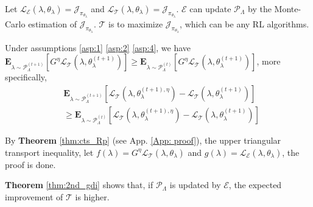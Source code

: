 \begin{Example}
    Let $\mathcal{L}_{\mathcal{E}} (\lambda, \theta_{\lambda}) = \mathcal{J}_{\pi_{\theta_{\lambda}}}$ and $\mathcal{L}_{\mathcal{T}} (\lambda, \theta_{\lambda}) = \mathcal{J}_{\pi_{\theta_{\lambda}}}$.
    $\mathcal{E}$ can update $\mathcal{P}_{\Lambda}$ by the Monte-Carlo estimation of $\mathcal{J}_{\pi_{\theta_{\lambda}}}$.
    $\mathcal{T}$ is to maximize $\mathcal{J}_{\pi_{\theta_{\lambda}}}$, which can be any RL algorithms.
\end{Example}

\begin{Theorem}
    Under assumptions \eqref{asp:1} \eqref{asp:2} \eqref{asp:4}, we have
    $\textbf{E}_{\lambda \sim \mathcal{P}_{\Lambda}^{(t+1)}}  [G^{\eta} \mathcal{L}_{\mathcal{T}} (\lambda, \theta_{\lambda}^{(t+1)})] 
    \geq \textbf{E}_{\lambda \sim \mathcal{P}_{\Lambda}^{(t)}}  [G^{\eta} \mathcal{L}_{\mathcal{T}} (\lambda, \theta_{\lambda}^{(t+1)})] $, more specifically,
   \begin{equation*}
       \begin{aligned}
               &\textbf{E}_{\lambda \sim \mathcal{P}_{\Lambda}^{(t+1)}}
    [\mathcal{L}_{\mathcal{T}} (\lambda, \theta_{\lambda}^{(t+1),\eta}) - \mathcal{L}_{\mathcal{T}} (\lambda, \theta_{\lambda}^{(t+1)}) ] \\
    &\geq \textbf{E}_{\lambda \sim \mathcal{P}_{\Lambda}^{(t)}}
    [\mathcal{L}_{\mathcal{T}} (\lambda, \theta_{\lambda}^{(t+1),\eta}) - \mathcal{L}_{\mathcal{T}} (\lambda, \theta_{\lambda}^{(t+1)}) ]
       \end{aligned}
   \end{equation*}
\label{thm:2nd_gdi}
\end{Theorem}

\begin{Proof}
    By \textbf{Theorem} \ref{thm:cts_Rp} (see App. \ref{App: proof}), the upper triangular transport inequality,
    let $f(\lambda) = G^{\eta} \mathcal{L}_{\mathcal{T}} (\lambda, \theta_{\lambda})$ and 
    $g(\lambda) = \mathcal{L}_{\mathcal{E}} (\lambda, \theta_{\lambda})$,
    the proof is done.
\end{Proof}

\begin{Remark}
    \textbf{Theorem} \ref{thm:2nd_gdi} shows that, if $\mathcal{P}_{\Lambda}$ is updated by $\mathcal{E}$, the expected improvement of $\mathcal{T}$ is higher.
\end{Remark}






